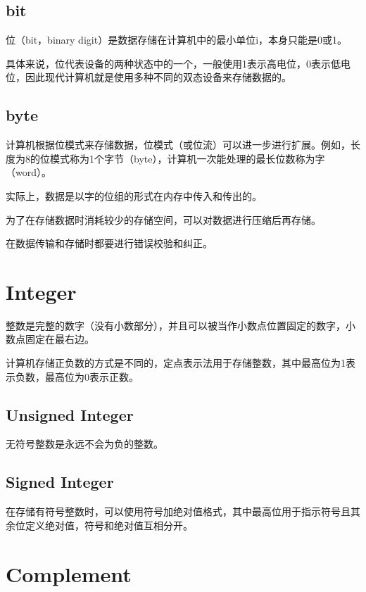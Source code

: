 \subsection{bit}


位（bit，binary digit）是数据存储在计算机中的最小单位i，本身只能是0或1。

具体来说，位代表设备的两种状态中的一个，一般使用1表示高电位，0表示低电位，因此现代计算机就是使用多种不同的双态设备来存储数据的。

\subsection{byte}


计算机根据位模式来存储数据，位模式（或位流）可以进一步进行扩展。例如，长度为8的位模式称为1个字节（byte），计算机一次能处理的最长位数称为字（word）。

实际上，数据是以字的位组的形式在内存中传入和传出的。

为了在存储数据时消耗较少的存储空间，可以对数据进行压缩后再存储。



在数据传输和存储时都要进行错误校验和纠正。




\section{Integer}


整数是完整的数字（没有小数部分），并且可以被当作小数点位置固定的数字，小数点固定在最右边。



计算机存储正负数的方式是不同的，定点表示法用于存储整数，其中最高位为1表示负数，最高位为0表示正数。

\subsection{Unsigned Integer}


无符号整数是永远不会为负的整数。


\subsection{Signed Integer}

在存储有符号整数时，可以使用符号加绝对值格式，其中最高位用于指示符号且其余位定义绝对值，符号和绝对值互相分开。


\section{Complement}


